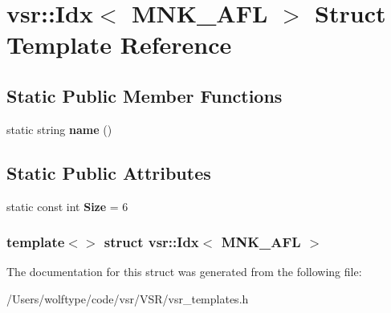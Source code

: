 \hypertarget{structvsr_1_1_idx_3_01_m_n_k___a_f_l_01_4}{\section{vsr\-:\-:Idx$<$ M\-N\-K\-\_\-\-A\-F\-L $>$ Struct Template Reference}
\label{structvsr_1_1_idx_3_01_m_n_k___a_f_l_01_4}
}
\subsection*{Static Public Member Functions}
\begin{DoxyCompactItemize}
\item 
\hypertarget{structvsr_1_1_idx_3_01_m_n_k___a_f_l_01_4_a7e302dcd9bd8efbbcff454536a72f4bc}{static string {\bfseries name} ()}\label{structvsr_1_1_idx_3_01_m_n_k___a_f_l_01_4_a7e302dcd9bd8efbbcff454536a72f4bc}

\end{DoxyCompactItemize}
\subsection*{Static Public Attributes}
\begin{DoxyCompactItemize}
\item 
\hypertarget{structvsr_1_1_idx_3_01_m_n_k___a_f_l_01_4_aa28bdef783cef5dfe149e61088ae71bd}{static const int {\bfseries Size} = 6}\label{structvsr_1_1_idx_3_01_m_n_k___a_f_l_01_4_aa28bdef783cef5dfe149e61088ae71bd}

\end{DoxyCompactItemize}
\subsubsection*{template$<$$>$ struct vsr\-::\-Idx$<$ M\-N\-K\-\_\-\-A\-F\-L $>$}



The documentation for this struct was generated from the following file\-:\begin{DoxyCompactItemize}
\item 
/\-Users/wolftype/code/vsr/\-V\-S\-R/vsr\-\_\-templates.\-h\end{DoxyCompactItemize}
